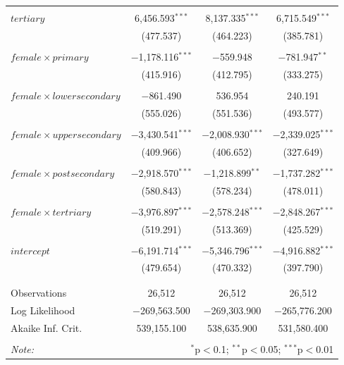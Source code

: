 \documentclass[a4paper]{article}\usepackage[]{graphicx}\usepackage[]{color}
\begin{document}
\begin{table}[H]
\begin{tabular}{@{\extracolsep{5pt}}lccc}
  & & & \\ 
 $tertiary$ & 6,456.593$^{***}$ & 8,137.335$^{***}$ & 6,715.549$^{***}$ \\ 
  & (477.537) & (464.223) & (385.781) \\ 
  & & & \\ 
 $female \times primary$ & $-$1,178.116$^{***}$ & $-$559.948 & $-$781.947$^{**}$ \\ 
  & (415.916) & (412.795) & (333.275) \\ 
  & & & \\ 
 $female \times lower secondary$ & $-$861.490 & 536.954 & 240.191 \\ 
  & (555.026) & (551.536) & (493.577) \\ 
  & & & \\ 
 $female \times upper secondary$ & $-$3,430.541$^{***}$ & $-$2,008.930$^{***}$ & $-$2,339.025$^{***}$ \\ 
  & (409.966) & (406.652) & (327.649) \\ 
  & & & \\ 
 $female \times post secondary$ & $-$2,918.570$^{***}$ & $-$1,218.899$^{**}$ & $-$1,737.282$^{***}$ \\ 
  & (580.843) & (578.234) & (478.011) \\ 
  & & & \\ 
 $female \times tertriary$ & $-$3,976.897$^{***}$ & $-$2,578.248$^{***}$ & $-$2,848.267$^{***}$ \\ 
  & (519.291) & (513.369) & (425.529) \\ 
  & & & \\ 
 $intercept$ & $-$6,191.714$^{***}$ & $-$5,346.796$^{***}$ & $-$4,916.882$^{***}$ \\ 
  & (479.654) & (470.332) & (397.790) \\ 
  & & & \\ 
\hline \\[-1.8ex] 
Observations & 26,512 & 26,512 & 26,512 \\ 
Log Likelihood & $-$269,563.500 & $-$269,303.900 & $-$265,776.200 \\ 
Akaike Inf. Crit. & 539,155.100 & 538,635.900 & 531,580.400 \\ 
\hline 
\hline \\[-1.8ex] 
\textit{Note:}  & \multicolumn{3}{r}{$^{*}$p$<$0.1; $^{**}$p$<$0.05; $^{***}$p$<$0.01} \\ 
\end{tabular} 
\end{table} 
\end{document}
